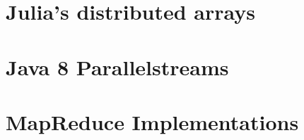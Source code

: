 \section{Julia's distributed arrays}
\section{Java 8 Parallelstreams}
\section{MapReduce Implementations}